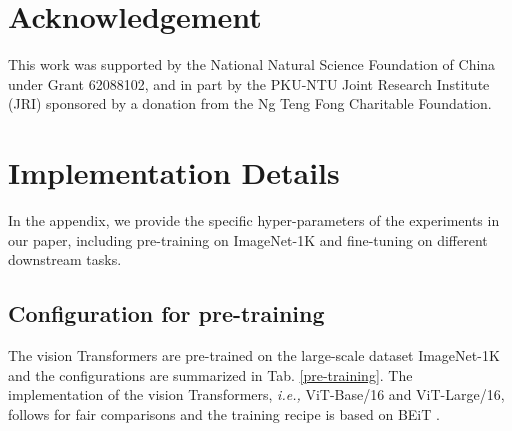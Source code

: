 \documentclass[runningheads]{llncs}
\begin{document}
\section*{Acknowledgement}
\label{acknowlegement}
This work was supported by the National Natural Science Foundation of China under Grant 62088102, and in part by the PKU-NTU Joint Research Institute (JRI) sponsored by a donation from the Ng Teng Fong Charitable Foundation.




\clearpage



\newpage
\appendix
\section{Implementation Details}
In the appendix, we provide the specific hyper-parameters of the experiments in our paper, including pre-training on ImageNet-1K and fine-tuning on different downstream tasks.
\subsection{Configuration for pre-training}

The vision Transformers are pre-trained on the large-scale dataset ImageNet-1K \cite{imagenet1k} and the configurations are summarized in Tab. \ref{pre-training}. The implementation of the vision Transformers, \textit{i.e.,} ViT-Base/16 and ViT-Large/16, follows \cite{deit} for fair comparisons and the training recipe is based on BEiT \cite{beit}.
\end{document}
